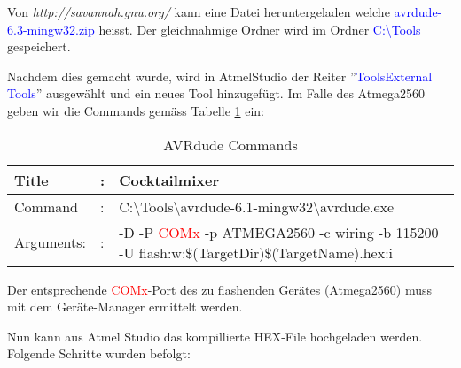Von \textit{http://savannah.gnu.org/} kann eine Datei heruntergeladen welche \textcolor{blue}{avrdude-6.3-mingw32.zip} heisst. Der gleichnahmige Ordner wird im Ordner \textcolor{blue}{C:\textbackslash Tools} gespeichert. \cite{savannahgnuorg_index_2016}

Nachdem dies gemacht wurde, wird in AtmelStudio der Reiter ''\textcolor{blue}{Tools\textrightarrow External Tools}'' ausgewählt und ein neues Tool hinzugefügt. Im Falle des Atmega2560 geben wir die Commands gemäss Tabelle \ref{tab:AVRdude_commands} ein:

\begin{table}[h!]
\center
\begin{tabularx}{\textwidth}{|l|l|X|}
\hline
Title & : & Cocktailmixer \\
\hline
Command & : & C:\textbackslash Tools\textbackslash avrdude-6.1-mingw32\textbackslash avrdude.exe \\
\hline
Arguments: & : & -D -P \textcolor{red}{ COMx} -p ATMEGA2560 -c wiring -b 115200 -U flash:w:\$(TargetDir)\$(TargetName).hex:i\\
\hline
\end{tabularx}
\caption{AVRdude Commands}
\label{tab:AVRdude_commands}
\end{table}

Der entsprechende \textcolor{red}{ COMx}-Port des zu flashenden Gerätes (Atmega2560) muss mit dem Geräte-Manager ermittelt werden. \cite{meier_mc1-skript_2017}

Nun kann aus Atmel Studio das kompillierte HEX-File hochgeladen werden.
\newpage
Folgende Schritte wurden befolgt:

